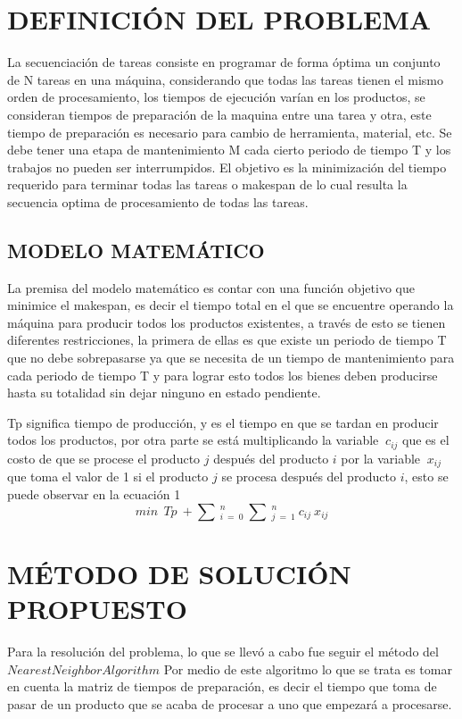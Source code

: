 \documentclass[twocolumn,10pt]{article}
\begin{document}
\section{DEFINICIÓN DEL PROBLEMA}
La secuenciación de tareas consiste en programar de forma óptima un conjunto de N tareas en una máquina, considerando que todas las tareas tienen el mismo orden de procesamiento, los tiempos de ejecución varían en los productos, se consideran tiempos de preparación de la maquina entre una tarea y otra, este tiempo de preparación es necesario para cambio de herramienta, material, etc. Se debe tener una etapa de mantenimiento M cada cierto periodo de tiempo T y los trabajos no pueden ser interrumpidos. El objetivo es la minimización del tiempo requerido para terminar todas las tareas o makespan de lo cual resulta la secuencia optima de procesamiento de todas las tareas\cite{Gupta}.



\subsection{MODELO MATEMÁTICO}
La premisa del modelo matemático es contar con una función objetivo que minimice el makespan, es decir el tiempo total en el que se encuentre operando la máquina para producir todos los productos existentes, a través de esto se tienen diferentes restricciones, la primera de ellas es que existe un periodo de tiempo T que no debe sobrepasarse ya que se necesita de un tiempo de mantenimiento para cada periodo de tiempo T y para lograr esto todos los bienes deben producirse hasta su totalidad sin dejar ninguno en estado pendiente.




Tp significa tiempo de producción, y es el tiempo en que se tardan en producir todos los productos, por otra parte se está multiplicando la variable $\:c_{ij}$ que es el costo de que se procese el producto $j$ después del producto $i$ por la variable $\:x_{ij}$ que toma el valor de 1 si el producto $j$ se procesa después del producto $i$, esto se puede observar en la ecuación 1
\begin{equation}
min\:\:Tp\:+\sum \:_{i\:=\:0}^n\:\sum \:_{j\:=\:1}^n\:c_{ij}\:x_{ij}
\end{equation}



\section{MÉTODO DE SOLUCIÓN PROPUESTO}
Para la resolución del problema, lo que se llevó a cabo fue seguir el método del $Nearest Neighbor Algorithm$ Por medio de este algoritmo lo que se trata es tomar en cuenta la matriz de tiempos de preparación, es decir el tiempo que toma de pasar de un producto que se acaba de procesar a uno que empezará a procesarse.
\end{document}

